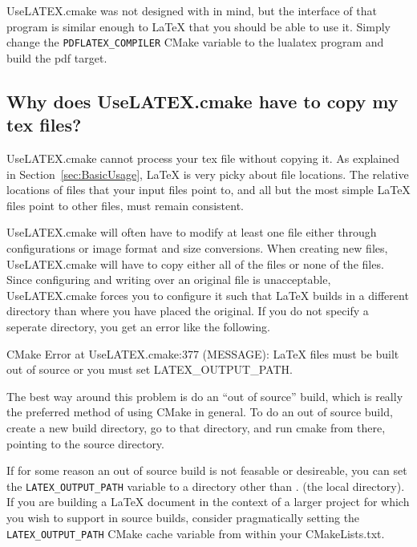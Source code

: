\documentclass{article}
\newcommand*{\textfile}[1]{\textsf{#1}}
\newcommand*{\textprog}[1]{\textfile{#1}}
\newcommand*{\textcmake}[1]{\texttt{#1}}
\newcommand*{\textcmakevar}[1]{\textcmake{#1}}
\newcommand*{\textmaketarget}[1]{#1}
\newcommand*{\UseLATEX}{\textfile{UseLATEX.cmake}\xspace}
\newcommand*{\latex}{\LaTeX\xspace}
\newcommand*{\lualatex}{\Hologo{LuaLaTeX}\xspace}
\begin{document}
  \UseLATEX was not designed with \lualatex in mind, but the
  interface of that program is similar enough to \latex that you should be
  able to use it. Simply change the \textcmakevar{PDFLATEX\_COMPILER} CMake
  variable to the \textprog{lualatex} program and build the
  \textmaketarget{pdf} target.

  \subsection{Why does \UseLATEX have to copy my tex files?}
  \label{sec:Why_does_UseLATEX_have_to_copy_my_tex_files}

  \UseLATEX cannot process your tex file without copying it.  As explained
  in Section~\ref{sec:BasicUsage}, \latex is very picky about file locations.
  The relative locations of files that your input files point to, and all
  but the most simple \latex files point to other files, must remain
  consistent.

  \UseLATEX will often have to modify at least one file either through
  configurations or image format and size conversions.  When creating new
  files, \UseLATEX will have to copy either all of the files or none of the
  files.  Since configuring and writing over an original file is
  unacceptable, \UseLATEX forces you to configure it such that \latex
  builds in a different directory than where you have placed the original.
  If you do not specify a seperate directory, you get an error like the
  following.

  \begin{CodeListing}
CMake Error at UseLATEX.cmake:377 (MESSAGE):
  LaTeX files must be built out of source or you must set
  LATEX_OUTPUT_PATH.
  \end{CodeListing}

  The best way around this problem is do an ``out of source'' build, which
  is really the preferred method of using CMake in general.  To do an out
  of source build, create a new build directory, go to that directory, and
  run cmake from there, pointing to the source directory.

  If for some reason an out of source build is not feasable or desireable,
  you can set the \textcmakevar{LATEX\_OUTPUT\_PATH} variable to a
  directory other than \textfile{.} (the local directory).  If you are
  building a \latex document in the context of a larger project for which
  you wish to support in source builds, consider pragmatically setting the
  \textcmakevar{LATEX\_OUTPUT\_PATH} CMake cache variable from within your
  \textfile{CMakeLists.txt}.
\end{document}
